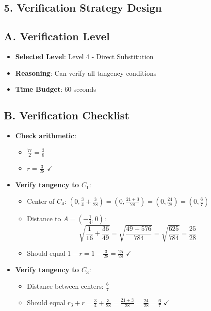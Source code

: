 \documentclass[11pt]{article}
\begin{document}
\begin{verificationbox}
\section*{5. Verification Strategy Design}

\subsection*{A. Verification Level}
\begin{itemize}[leftmargin=*]
    \item \textbf{Selected Level}: Level 4 - Direct Substitution
    \item \textbf{Reasoning}: Can verify all tangency conditions
    \item \textbf{Time Budget}: 60 seconds
\end{itemize}

\subsection*{B. Verification Checklist}
\begin{itemize}[leftmargin=*]
    \item \textbf{Check arithmetic}:
    \begin{itemize}
        \item $\frac{7r}{2} = \frac{3}{8}$
        \item $r = \frac{3}{28}$ $\checkmark$
    \end{itemize}
    \item \textbf{Verify tangency to $C_1$}:
    \begin{itemize}
        \item Center of $C_4$: $(0, \frac{3}{4} + \frac{3}{28}) = (0, \frac{21+3}{28}) = (0, \frac{24}{28}) = (0, \frac{6}{7})$
        \item Distance to $A = (-\frac{1}{4}, 0)$:
        \[\sqrt{\frac{1}{16} + \frac{36}{49}} = \sqrt{\frac{49 + 576}{784}} = \sqrt{\frac{625}{784}} = \frac{25}{28}\]
        \item Should equal $1 - r = 1 - \frac{3}{28} = \frac{25}{28}$ $\checkmark$
    \end{itemize}
    \item \textbf{Verify tangency to $C_3$}:
    \begin{itemize}
        \item Distance between centers: $\frac{6}{7}$
        \item Should equal $r_3 + r = \frac{3}{4} + \frac{3}{28} = \frac{21+3}{28} = \frac{24}{28} = \frac{6}{7}$ $\checkmark$
    \end{itemize}
\end{itemize}


\end{verificationbox}
\end{document}
